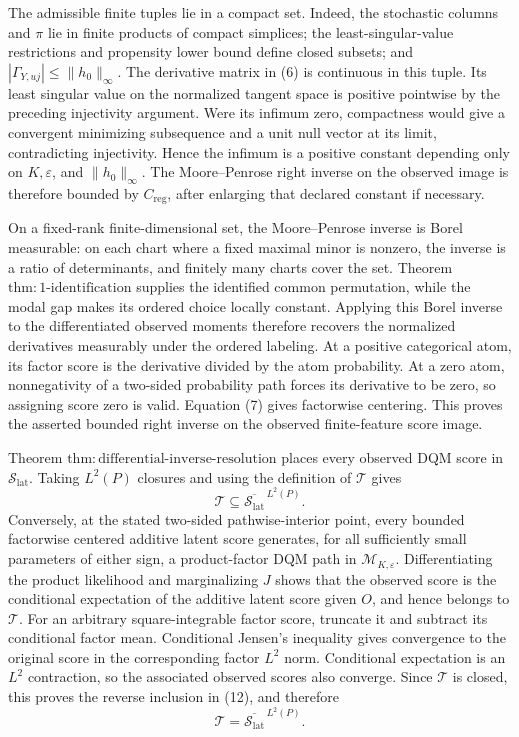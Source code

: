 The admissible finite tuples lie in a compact set.  Indeed, the stochastic columns and \(\pi\) lie in finite products of compact simplices; the least-singular-value restrictions and propensity lower bound define closed subsets; and \(|\Gamma_{Y,uj}|\leq\|h_0\|_\infty\).  The derivative matrix in (6) is continuous in this tuple.  Its least singular value on the normalized tangent space is positive pointwise by the preceding injectivity argument.  Were its infimum zero, compactness would give a convergent minimizing subsequence and a unit null vector at its limit, contradicting injectivity.  Hence the infimum is a positive constant depending only on \(K,\varepsilon\), and \(\|h_0\|_\infty\).  The Moore--Penrose right inverse on the observed image is therefore bounded by \(C_{\mathrm{reg}}\), after enlarging that declared constant if necessary.

On a fixed-rank finite-dimensional set, the Moore--Penrose inverse is Borel measurable: on each chart where a fixed maximal minor is nonzero, the inverse is a ratio of determinants, and finitely many charts cover the set.  Theorem \(\mathrm{thm{:}1\mbox{-}identification}\) supplies the identified common permutation, while the modal gap makes its ordered choice locally constant.  Applying this Borel inverse to the differentiated observed moments therefore recovers the normalized derivatives measurably under the ordered labeling.  At a positive categorical atom, its factor score is the derivative divided by the atom probability.  At a zero atom, nonnegativity of a two-sided probability path forces its derivative to be zero, so assigning score zero is valid.  Equation (7) gives factorwise centering.  This proves the asserted bounded right inverse on the observed finite-feature score image.

Theorem \(\mathrm{thm{:}differential\mbox{-}inverse\mbox{-}resolution}\) places every observed DQM score in \(\mathcal S_{\mathrm{lat}}\).  Taking \(L^2(P)\) closures and using the definition of \(\mathcal T\) gives
\[
 \mathcal T\subseteq\overline{\mathcal S_{\mathrm{lat}}}^{\,L^2(P)}. \tag{12}
\]
Conversely, at the stated two-sided pathwise-interior point, every bounded factorwise centered additive latent score generates, for all sufficiently small parameters of either sign, a product-factor DQM path in \(\mathcal M_{K,\varepsilon}\).  Differentiating the product likelihood and marginalizing \(J\) shows that the observed score is the conditional expectation of the additive latent score given \(O\), and hence belongs to \(\mathcal T\).  For an arbitrary square-integrable factor score, truncate it and subtract its conditional factor mean.  Conditional Jensen's inequality gives convergence to the original score in the corresponding factor \(L^2\) norm.  Conditional expectation is an \(L^2\) contraction, so the associated observed scores also converge.  Since \(\mathcal T\) is closed, this proves the reverse inclusion in (12), and therefore
\[
 \mathcal T=\overline{\mathcal S_{\mathrm{lat}}}^{\,L^2(P)}. \tag{13}
\]

